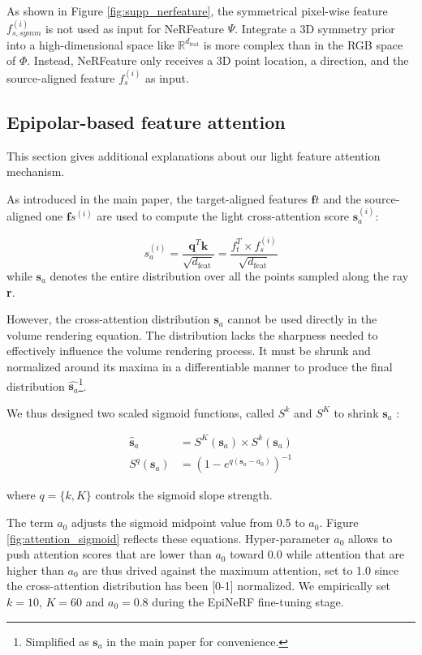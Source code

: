 As shown in Figure \ref{fig:supp_nerfeature}, the symmetrical pixel-wise feature $f_{s,symm}^{(i)}$ is not used as input for NeRFeature $\Psi$. Integrate a 3D symmetry prior into a high-dimensional space like $\mathbb{R}^{d_{\text{feat}}}$ is more complex than in the RGB space of $\Phi$. Instead, NeRFeature only receives a 3D point location, a direction, and the source-aligned feature $f_{s}^{(i)}$ as input.

\subsection{Epipolar-based feature attention}
This section gives additional explanations about our light feature attention mechanism.

As introduced in the main paper, the target-aligned features $\mathbf{f}{t}$ and the source-aligned one $\mathbf{f}{s}^{(i)}$ are used to compute the light cross-attention score $\mathbf{s}_{a}^{(i)}$:

\begin{equation}
    s_{a}^{(i)} = \frac{\mathbf{q}^{T}\mathbf{k}}{\sqrt{d_{\text{feat}}}}= \frac{f_{t}^{T}\times f_{s}^{(i)}}{\sqrt{d_{\text{feat}}}}
\label{eq:attention}
\end{equation}
while $\mathbf{s}_{a}$ denotes the entire distribution over all the points sampled along the ray \textbf{r}.

However, the cross-attention distribution $\mathbf{s}_{a}$ cannot be used directly in the volume rendering equation. The distribution lacks the sharpness needed to effectively influence the volume rendering process. It must be shrunk and normalized around its maxima in a differentiable manner to produce the final distribution $\hat{\mathbf{s}_{a}}$\footnote{Simplified as $\mathbf{s}_{a}$ in the main paper for convenience.}.

We thus designed two scaled sigmoid functions, called $S^{k}$ and $S^{K}$ to shrink $\mathbf{s}_{a}$ : 

\begin{align}
\hat{\textbf{s}}_{a} &= S^{K}(\textbf{s}_{a})\times S^{k}(\textbf{s}_{a}) \\
S^{q}(\mathbf{s}_{a}) &= \left(1- e^{q(\mathbf{s}_{a}-a_{0})}\right)^{-1}
\end{align}

where $q=\{k,K\}$ controls the sigmoid slope strength. \newline

The term $a_{0}$ adjusts the sigmoid midpoint value from 0.5 to $a_{0}$. Figure \ref{fig:attention_sigmoid} reflects these equations. Hyper-parameter $a_{0}$ allows to push attention scores that are lower than  $a_{0}$ toward 0.0 while attention that are higher than $a_{0}$ are thus drived against the maximum attention, set to 1.0 since the cross-attention distribution has been [0-1] normalized. We empirically set $k=10$, $K=60$ and $a_{0}=0.8$ during the EpiNeRF fine-tuning stage.\newline

